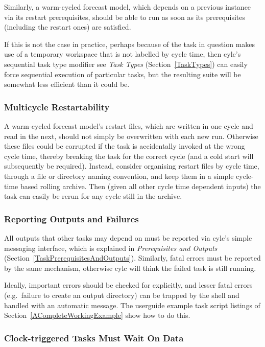 \documentclass[11pt,a4paper]{article}
\begin{document}
Similarly, a warm-cycled forecast model, which depends on a previous
instance via its restart prerequisites, should be able to run as soon as
its prerequisites (including the restart ones) are satisfied.

If this is not the case in practice, perhaps because of the task in
question makes use of a temporary workspace that is not labelled by
cycle time, then cylc's sequential task type modifier see {\em Task
Types} (Section~\ref{TaskTypes}) can easily force sequential execution
of particular tasks, but the resulting suite will be somewhat less
efficient than it could be.

\subsubsection{Multicycle Restartability} 

A warm-cycled forecast model's restart files, which are written in
one cycle and read in the next, should not simply be overwritten with
each new run. Otherwise these files could be corrupted if the task is
accidentally invoked at the wrong cycle time, thereby breaking the task
for the correct cycle (and a cold start will subsequently be required).
Instead, consider organising restart files by cycle time, through a file
or directory naming convention, and keep them in a simple cycle-time
based rolling archive. Then (given all other cycle time dependent
inputs) the task can easily be rerun for any cycle still in the archive.

\subsubsection{Reporting Outputs and Failures}

All outputs that other tasks may depend on must be reported via cylc's
simple messaging interface, which is explained in {\em Prerequisites and
Outputs} (Section~\ref{TaskPrerequisitesAndOutputs}). Similarly, fatal
errors must be reported by the same mechanism, otherwise cylc will think
the failed task is still running. 

Ideally, important errors should be checked for explicitly, and lesser
fatal errors (e.g.\ failure to create an output directory) can be
trapped by the shell and handled with an automatic message. The
userguide example task script listings of
Section~\ref{ACompleteWorkingExample} show how to do this.

\subsubsection{Clock-triggered Tasks Must Wait On Data}
\end{document}

